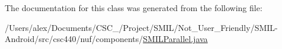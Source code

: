 The documentation for this class was generated from the following file\-:\begin{DoxyCompactItemize}
\item 
/\-Users/alex/\-Documents/\-C\-S\-C\-\_/\-Project/\-S\-M\-I\-L/\-Not\-\_\-\-User\-\_\-\-Friendly/\-S\-M\-I\-L-\/\-Android/src/csc440/nuf/components/\hyperlink{_s_m_i_l_parallel_8java}{S\-M\-I\-L\-Parallel.\-java}\end{DoxyCompactItemize}
